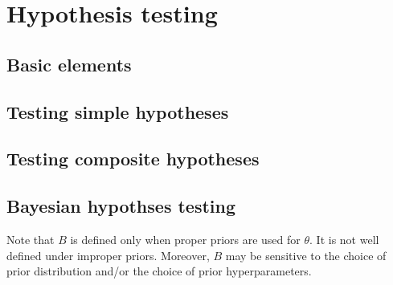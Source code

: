 \section{Hypothesis testing}

\subsection{Basic elements}

\subsection{Testing simple hypotheses}

\subsection{Testing composite hypotheses}

\subsection{Bayesian hypothses testing}


Note that $B$ is deﬁned only when proper priors are used for $\theta$. It is not well deﬁned under improper priors.
Moreover, $B$ may be sensitive to the choice of prior distribution and/or the choice of prior hyperparameters.

